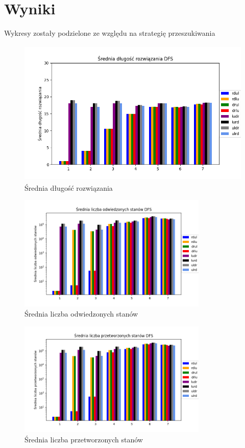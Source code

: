 \documentclass{classrep}
\begin{document}
    \section{Wyniki} {
        Wykresy zostały podzielone ze względu na strategię przeszukiwania

        \begin{figure}[!htbp]
            \centering
            \includegraphics[width=\textwidth, height=70mm]{wykresy/dfs1.png}
            \caption{Średnia długość rozwiązania}
        \end{figure}

        \begin{figure}[!htbp]
            \centering
            \includegraphics[width=\textwidth, height=55mm]{wykresy/dfs2.png}
            \caption{Średnia liczba odwiedzonych stanów}
        \end{figure}

         \begin{figure}[!htbp]
             \centering
            \includegraphics[width=\textwidth, height=55mm]{wykresy/dfs3.png}
            \caption{Średnia liczba przetworzonych stanów}
        \end{figure}

}
\end{document}
